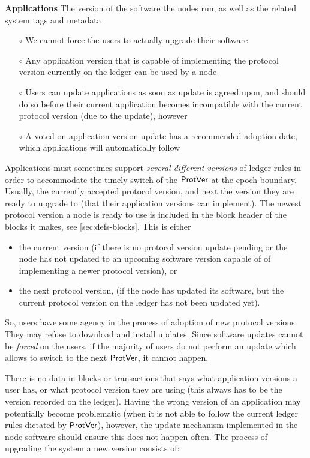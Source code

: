 \textbf{Applications} The version of the software the nodes run,
as well as the related system tags and metadata
\begin{itemize}
\item[$\circ$] We cannot force the users to actually upgrade their software
\item[$\circ$] Any application version that is capable of implementing the protocol version
currently on the ledger can be used by a node
\item[$\circ$] Users can update applications as soon as update is agreed upon, and should
do so before their current application becomes incompatible with the
current protocol version (due to the update), however
\item[$\circ$] A voted on application version update has a recommended adoption date,
which applications will automatically follow
\end{itemize}

Applications must sometimes support \textit{several different versions}
of ledger rules in order to accommodate the timely switch of the $\mathsf{ProtVer}$ at the
epoch boundary. Usually, the currently accepted protocol version, and next the
version they are ready to upgrade to (that their application versions can
implement).
The newest protocol version a node is ready to use is included in the block
header of the blocks it makes, see \ref{sec:defs-blocks}. This is either

\begin{itemize}
\item the current version (if there is no protocol version update pending or the node
has not updated to an upcoming software version capable of of implementing a
newer protocol version), or
\item the next protocol version,
(if the node has updated its software, but the current protocol version on the
ledger has not been updated yet).
\end{itemize}

So, users have some agency in the process of adoption of
new protocol versions. They may refuse to download and install updates.
Since software updates cannot be \textit{forced} on the users, if the majority of
users do not perform an update which allows to switch to the next $\mathsf{ProtVer}$,
it cannot happen.

There is no data in blocks or transactions that says what application
versions a user has, or what protocol version they are using (this always has to
be the version recorded on the ledger).
Having the wrong version of an application
may potentially become problematic (when it is not able to follow the current
ledger rules dictated by $\mathsf{ProtVer}$), however, the update mechanism implemented
in the node software should
ensure this does not happen often.
The process of upgrading the system a new version consists of:

